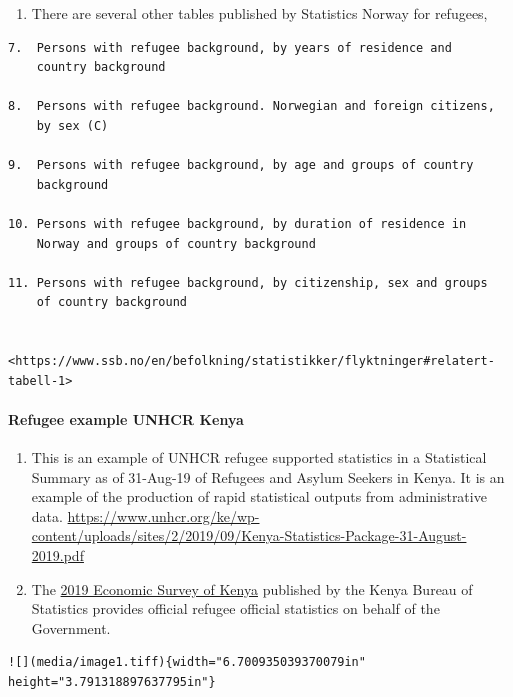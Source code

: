 \documentclass[
]{article}
\providecommand{\tightlist}{%
  \setlength{\itemsep}{0pt}\setlength{\parskip}{0pt}}
\begin{document}
\begin{enumerate}
\def\labelenumi{\arabic{enumi}.}
\setcounter{enumi}{412}
\tightlist
\item
  There are several other tables published by Statistics Norway for
  refugees,
\end{enumerate}

\begin{verbatim}
7.  Persons with refugee background, by years of residence and
    country background

8.  Persons with refugee background. Norwegian and foreign citizens,
    by sex (C)

9.  Persons with refugee background, by age and groups of country
    background

10. Persons with refugee background, by duration of residence in
    Norway and groups of country background

11. Persons with refugee background, by citizenship, sex and groups
    of country background

    <https://www.ssb.no/en/befolkning/statistikker/flyktninger#relatert-tabell-1>
\end{verbatim}

\hypertarget{refugee-example-unhcr-kenya-1}{%
\paragraph{Refugee example UNHCR Kenya}\label{refugee-example-unhcr-kenya-1}}

\begin{enumerate}
\def\labelenumi{\arabic{enumi}.}
\setcounter{enumi}{413}
\item
  This is an example of UNHCR refugee supported statistics in a
  Statistical Summary as of 31-Aug-19 of Refugees and Asylum Seekers
  in Kenya. It is an example of the production of rapid statistical
  outputs from administrative data.
  \url{https://www.unhcr.org/ke/wp-content/uploads/sites/2/2019/09/Kenya-Statistics-Package-31-August-2019.pdf}
\item
  The \href{https://africaopendata.org/dataset/kenya-economic-survey-2019/resource/5b9357a4-6227-4fbf-9e10-ae7043a41ce3}{2019 Economic Survey of
  Kenya}
  published by the Kenya Bureau of Statistics provides official
  refugee official statistics on behalf of the Government.
\end{enumerate}

\begin{verbatim}
![](media/image1.tiff){width="6.700935039370079in"
height="3.791318897637795in"}
\end{verbatim}
\end{document}
